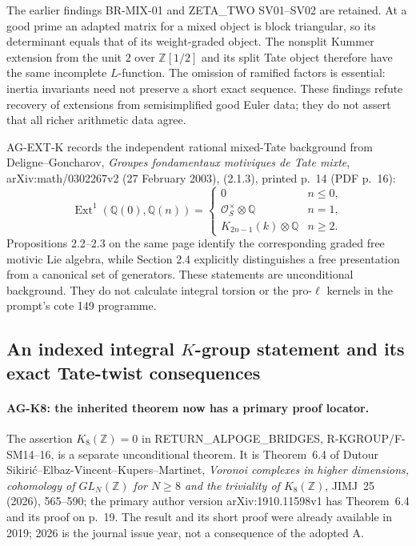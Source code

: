 The earlier findings BR-MIX-01 and ZETA\_TWO SV01--SV02 are retained.
At a good prime an adapted matrix for a mixed object is block triangular,
so its determinant equals that of its weight-graded object. The nonsplit
Kummer extension from the unit $2$ over $\mathbb Z[1/2]$ and its split
Tate object therefore have the same incomplete $L$-function. The omission
of ramified factors is essential: inertia invariants need not preserve a
short exact sequence. These findings refute recovery of extensions from
semisimplified good Euler data; they do not assert that all richer
arithmetic data agree.

AG-EXT-K records the independent rational mixed-Tate background from Deligne--Goncharov,
\emph{Groupes fondamentaux motiviques de Tate mixte},
arXiv:math/0302267v2 (27 February 2003), (2.1.3), printed p.~14
(PDF p.~16):
\[
 \operatorname{Ext}^1(\mathbb Q(0),\mathbb Q(n))=
 \begin{cases}
 0&n\le0,\\
 \mathcal O_S^\times\otimes\mathbb Q&n=1,\\
 K_{2n-1}(k)\otimes\mathbb Q&n\ge2.
 \end{cases}
\]
Propositions 2.2--2.3 on the same page identify the corresponding graded
free motivic Lie algebra, while Section 2.4 explicitly distinguishes a
free presentation from a canonical set of generators. These statements
are unconditional background. They do not calculate integral torsion or
the pro-$\ell$ kernels in the prompt's cote 149 programme.

\subsection{An indexed integral $K$-group statement and its exact Tate-twist consequences}
\label{ag:k8}

\paragraph{AG-K8: the inherited theorem now has a primary proof locator.}
The assertion $K_8(\mathbb Z)=0$ in RETURN\_ALPOGE\_BRIDGES,
R-KGROUP/F-SM14--16, is a separate unconditional theorem.
It is Theorem~6.4 of Dutour Sikiri\'c--Elbaz-Vincent--Kupers--Martinet,
\emph{Voronoi complexes in higher dimensions, cohomology of
$GL_N(\mathbb Z)$ for $N\ge8$ and the triviality of $K_8(\mathbb Z)$},
JIMJ~25 (2026), 565--590; the primary author version
arXiv:1910.11598v1 has Theorem~6.4 and its proof on p.~19.
The result and its short proof were already available in 2019;
2026 is the journal issue year, not a consequence of the adopted A.


